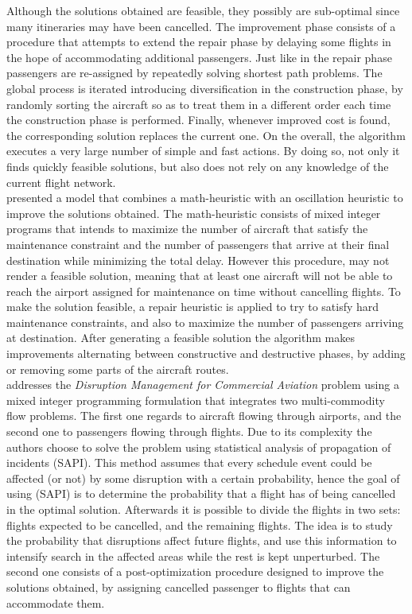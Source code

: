 \documentclass[ijoo,nonblindrev]{informs-ijoo}
\begin{document}
Although the solutions obtained are feasible, they possibly are sub-optimal since many itineraries may have been cancelled. The improvement phase consists of a procedure that attempts to extend the repair phase by delaying some flights in the hope of accommodating additional passengers. Just like in the repair phase passengers are re-assigned by repeatedly solving shortest path problems.
The global process is iterated introducing diversification in the construction phase, by randomly sorting the aircraft so as to treat them in a different order each time the construction phase is performed. Finally, whenever improved cost is found, the corresponding solution replaces the current one.
On the overall, the algorithm executes a very large number of simple and fast actions. By doing so, not only it finds quickly feasible solutions, but also does not rely on any knowledge of the current flight network.\\
\citep{Mansi2012} presented a model that combines a math-heuristic with an oscillation heuristic to improve the solutions obtained. The math-heuristic consists of mixed integer programs that intends to maximize the number of aircraft that satisfy the maintenance constraint and the number of passengers that arrive at their final destination while minimizing the total delay. However this procedure, may not render a feasible solution, meaning that at least one aircraft will not be able to reach the airport assigned for maintenance on time without cancelling flights. To make the solution feasible, a repair heuristic is applied to try to satisfy hard maintenance constraints, and also to maximize the number of passengers arriving at destination. After generating a feasible solution the algorithm makes improvements alternating between constructive and destructive phases, by adding or removing some parts of the aircraft routes.\\
\citep{acuna2009} addresses the \textit{Disruption Management for Commercial Aviation} problem using a mixed integer programming formulation that integrates two multi-commodity flow problems. The first one regards to aircraft flowing through airports, and the second one to passengers flowing through flights. Due to its complexity the authors choose to solve the problem using statistical analysis of propagation of incidents (SAPI). This method assumes that every schedule event could be affected (or not) by some disruption with a certain probability, hence the goal of using (SAPI) is to determine the probability that a flight has of being cancelled in the optimal solution. Afterwards it is possible to divide the flights in two sets: flights expected to be cancelled, and the remaining flights. The idea is to study the probability that disruptions affect future flights, and use this information to intensify search in the affected areas while the rest is kept unperturbed. The second one consists of a post-optimization procedure designed to improve the solutions obtained, by assigning cancelled passenger to flights that can accommodate them.\\
\end{document}
